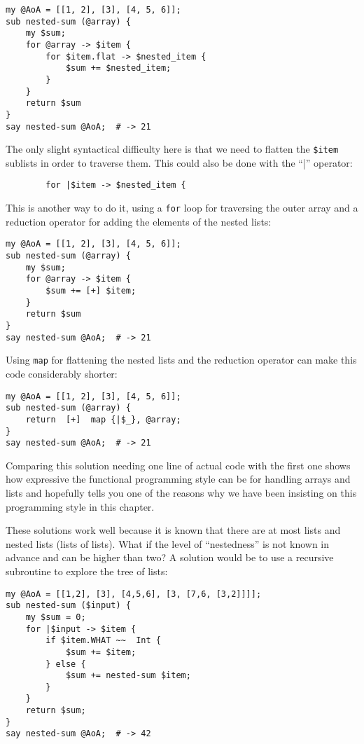 \begin{verbatim}
my @AoA = [[1, 2], [3], [4, 5, 6]];
sub nested-sum (@array) { 
    my $sum; 
    for @array -> $item { 
        for $item.flat -> $nested_item {
            $sum += $nested_item;
        }
    } 
    return $sum
}
say nested-sum @AoA;  # -> 21
\end{verbatim}

The only slight syntactical difficulty here is that 
we need to flatten the \verb'$item' sublists in order 
to traverse them. This could also be done with the ``|'' 
operator:
\begin{verbatim}
        for |$item -> $nested_item {
\end{verbatim}

This is another way to do it, using a {\tt for} loop for 
traversing the outer array and a reduction operator 
for adding the elements of the nested lists:

\begin{verbatim}
my @AoA = [[1, 2], [3], [4, 5, 6]];
sub nested-sum (@array) { 
    my $sum; 
    for @array -> $item { 
        $sum += [+] $item;
    } 
    return $sum
}
say nested-sum @AoA;  # -> 21
\end{verbatim}

Using {\tt map} for flattening the nested lists and 
the reduction operator can make this code considerably 
shorter:

\begin{verbatim}
my @AoA = [[1, 2], [3], [4, 5, 6]];
sub nested-sum (@array) { 
    return  [+]  map {|$_}, @array;
}
say nested-sum @AoA;  # -> 21
\end{verbatim}

Comparing this solution needing one line of actual code 
with the first one shows how expressive the functional 
programming style can be for handling arrays and lists 
and hopefully tells you one of the reasons why we have 
been insisting on this programming style in this 
chapter.

These solutions work well because it is known that there 
are at most lists and nested lists (lists of lists). What 
if the level of ``nestedness'' is not known in advance 
and can be higher than two? A solution would be to use 
a recursive subroutine to explore the tree of lists:

\begin{verbatim}
my @AoA = [[1,2], [3], [4,5,6], [3, [7,6, [3,2]]]];
sub nested-sum ($input) { 
    my $sum = 0; 
    for |$input -> $item { 
        if $item.WHAT ~~  Int {
            $sum += $item;
        } else {
            $sum += nested-sum $item;
        }
    } 
    return $sum;
}
say nested-sum @AoA;  # -> 42
\end{verbatim}

